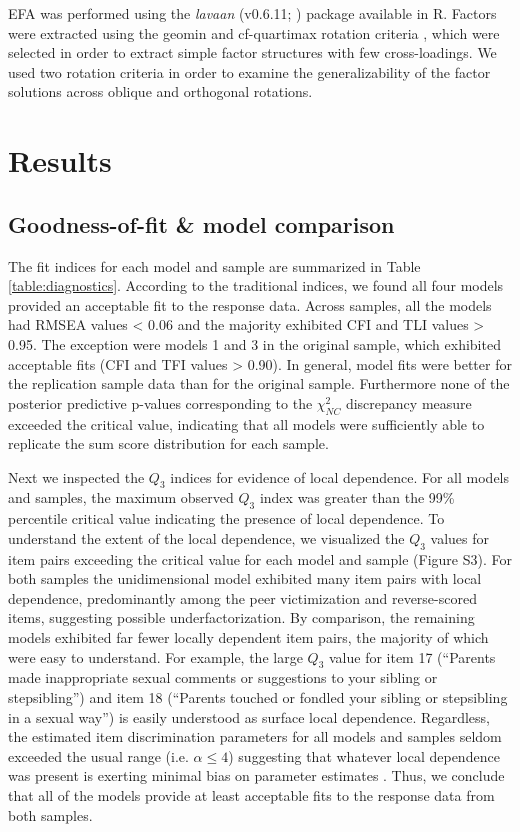 \documentclass[letterpaper,man,natbib]{apa6}  %
\begin{document}
EFA was performed using the \textit{lavaan} (v0.6.11; \citealt{lavaan}) package available in R. Factors were extracted using the geomin \citep{yates1987multivariate} and cf-quartimax rotation criteria \citep{crawford1970general}, which were selected in order to extract simple factor structures with few cross-loadings. We used two rotation criteria in order to examine the generalizability of the factor solutions across oblique and orthogonal rotations. 

\section{Results}

\subsection{Goodness-of-fit \& model comparison}

The fit indices for each model and sample are summarized in Table \ref{table:diagnostics}. According to the traditional indices, we found all four models provided an acceptable fit to the response data. Across samples, all the models had RMSEA values < 0.06 and the majority exhibited CFI and TLI values > 0.95. The exception were models 1 and 3 in the original sample, which exhibited acceptable fits (CFI and TFI values > 0.90). In general, model fits were better for the replication sample data than for the original sample. Furthermore none of the posterior predictive p-values corresponding to the $\chi^2_{NC}$ discrepancy measure exceeded the critical value, indicating that all models were sufficiently able to replicate the sum score distribution for each sample. 

Next we inspected the $Q_3$ indices for evidence of local dependence. For all models and samples, the maximum observed $Q_3$ index was greater than the 99\% percentile critical value indicating the presence of local dependence. To understand the extent of the local dependence, we visualized the $Q_3$ values for item pairs exceeding the critical value for each model and sample (Figure S3). For both samples the unidimensional model exhibited many item pairs with local dependence, predominantly among the peer victimization and reverse-scored items, suggesting possible underfactorization. By comparison, the remaining models exhibited far fewer locally dependent item pairs, the majority of which were easy to understand. For example, the large $Q_3$ value for item 17 (``Parents made inappropriate sexual comments or suggestions to your sibling or stepsibling'') and item 18 (``Parents touched or fondled your sibling or stepsibling in a sexual way'') is easily understood as surface local dependence. Regardless, the estimated item discrimination parameters for all models and samples seldom exceeded the usual range (i.e. $\alpha \leq 4$) suggesting that whatever local dependence was present is exerting minimal bias on parameter estimates \citep{edwards2018diagnostic}. Thus, we conclude that all of the models provide at least acceptable fits to the response data from both samples.
\end{document}
